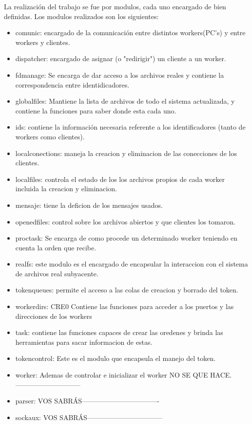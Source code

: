 \documentclass[11pt]{article}
\begin{document}
La realización del trabajo se fue por modulos, cada uno encargado de bien definidas. Los modulos realizados son los siguientes:
\begin{itemize}
\item comunic: encargado de la comunicación entre distintos workers(PC's) y entre workers y clientes.
\item dispatcher: encargado de asignar (o "redirigir") un cliente a un worker.
\item fdmanage: Se encarga de dar acceso a los archivos reales y contiene la correspondencia entre identidicadores.
\item globalfiles: Mantiene la lista de archivos de todo el sistema actualizada, y contiene la funciones para saber donde esta cada uno.
\item ids: contiene la información necesaria referente a los identificadores (tanto de workers como clientes).
\item localconections: maneja la creacion y eliminacion de las conecciones de los clientes.
\item localfiles: controla el estado de los los archivos propios de cada worker incluida la creacion y eliminacion.
\item mensaje: tiene la deficion de los mensajes usados.
\item openedfiles: control sobre los archivos abiertos y que clientes los tomaron.
\item proctask: Se encarga de como procede un determinado worker teniendo en cuenta la orden que recibe.
\item realfs: este modulo es el encargado de encapsular la interaccion con el sistema de archivos real subyacente.
\item tokenqueues: permite el acceso a las colas de creacion y borrado del token.
\item workerdirs: CRE0 Contiene las funciones para acceder a los puertos y las direcciones de los workers
\item task: contiene las funciones capaces de crear las oredenes y brinda las herramientas para sacar informacion de estas.
\item tokencontrol: Este es el modulo que encapsula el manejo del token.
\item worker: Ademas de controlar e inicializar el worker NO SE QUE HACE.-----------------------------
\item parser: VOS SABRÁS----------------------------------
\item sockaux: VOS SABRÁS---------------------------------
\end{itemize}
\end{document}
